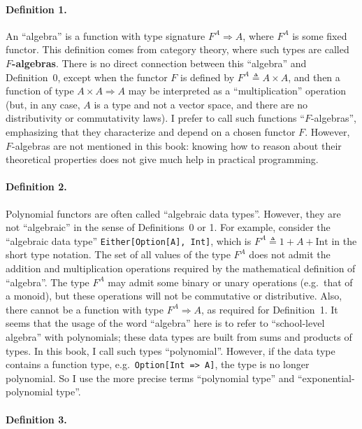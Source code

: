 \paragraph{Definition 1.}

An ``algebra'' is a function with type signature $F^{A}\Rightarrow A$,
where $F^{A}$ is some fixed functor. This definition comes from category
theory, where such types are called \textbf{$F$-algebras}.
There is no direct connection between this ``algebra'' and Definition~0,
except when the functor $F$ is defined by $F^{A}\triangleq A\times A$,
and then a function of type $A\times A\Rightarrow A$ may be interpreted
as a ``multiplication'' operation (but, in any case, $A$ is a type
and not a vector space, and there are no distributivity or commutativity
laws). I prefer to call such functions ``$F$-algebras'', emphasizing
that they characterize and depend on a chosen functor $F$. However,
$F$-algebras are not mentioned in this book: knowing how to reason
about their theoretical properties does not give much help in practical
programming.

\paragraph{Definition 2.}

Polynomial functors are often called “algebraic data types”. However,
they are not “algebraic” in the sense of Definitions~0 or 1. For
example, consider the “algebraic data type” \lstinline!Either[Option[A], Int]!,
which is $F^{A}\triangleq1+A+\text{Int}$ in the short type notation.
The set of all values of the type $F^{A}$ does not admit the addition
and multiplication operations required by the mathematical definition
of ``algebra''. The type $F^{A}$ may admit some binary or unary
operations (e.g.~that of a monoid), but these operations will not
be commutative or distributive. Also, there cannot be a function with
type $F^{A}\Rightarrow A$, as required for Definition~1. It seems
that the usage of the word ``algebra'' here is to refer to ``school-level
algebra'' with polynomials; these data types are built from sums
and products of types. In this book, I call such types ``polynomial''.
However, if the data type contains a function type, e.g.~\lstinline!Option[Int => A]!,
the type is no longer polynomial. So I use the more precise terms
“polynomial type” and “exponential-polynomial type”.

\paragraph{Definition 3.}


